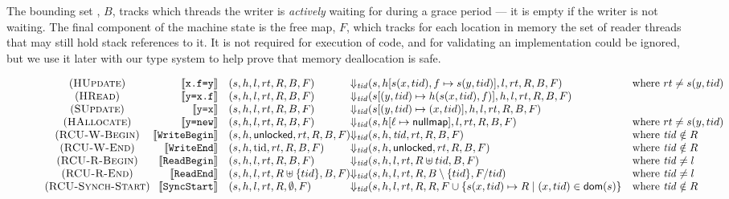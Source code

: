 The bounding set , $B$, tracks which threads the writer is \emph{actively} waiting for during a grace period --- it is empty if the writer is not waiting.
The final component of the machine state is the free map, $F$, which tracks for each location in memory the set of reader threads that may still hold stack references to it.  It is not required for execution of code, and for validating an implementation could be ignored, but we use it later with our type system to help prove that memory deallocation is safe.
\begin{figure*}%
\tiny
\[\begin{array}{c@{\;}rl@{\Downarrow_{\mathit{tid}}}ll}
(\textsc{HUpdate}) & \llbracket\texttt{x.f=y}\rrbracket   &(s,h,l,rt,R,B,F)& (s,h[s(x,tid),f \mapsto s(y,tid)],l,rt,R,B,F) &\textrm{where}~ rt \neq s(y,tid)\\
(\textsc{HRead})   & \llbracket\texttt{y=x.f}\rrbracket   &(s,h,l,rt,R,B,F)& (s[(y,tid) \mapsto h(s(x,tid),f)],h,l,rt,R,B,F) & \\
(\textsc{SUpdate}) & \llbracket\texttt{y=x}\rrbracket     &(s,h,l,rt,R,B,F)& (s[(y,tid) \mapsto (x,tid)],h,l,rt,R,B,F) &\\
(\textsc{HAllocate}) & \llbracket\texttt{y=new}\rrbracket &(s,h,l,rt,R,B,F)& (s,h[\ell\mapsto\mathsf{nullmap}],l,rt,R,B,F) & \textrm{where}~ rt \neq s(y,tid) \\
(\textsc{RCU-W-Begin}) & \llbracket\texttt{WriteBegin}\rrbracket & (s,h,\mathsf{unlocked},rt,R,B,F) &(s,h,\mathit{tid},rt,R,B,F) & \textrm{where}~\mathit{tid}\notin R\\
(\textsc{RCU-W-End}) & \llbracket\texttt{WriteEnd}\rrbracket & (s,h,\mathrm{tid},rt,R,B,F) & (s,h,\mathsf{unlocked},rt,R,B,F) & \textrm{where}~\mathit{tid}\notin R\\
(\textsc{RCU-R-Begin}) & \llbracket\texttt{ReadBegin}\rrbracket & (s,h,l,rt,R,B,F) & (s,h,l,rt,R\uplus tid,B,F) & \textrm{where}~\mathit{tid}\neq l\\
(\textsc{RCU-R-End}) & \llbracket\texttt{ReadEnd}\rrbracket & (s,h,l,rt,R\uplus\{tid\},B,F) & (s,h,l,rt,R,B\setminus \{tid\},F / tid)  &
\textrm{where}~\mathit{tid}\neq l\\
(\textsc{RCU-Synch-Start}) & \llbracket\texttt{SyncStart}\rrbracket & (s,h,l,rt,R,\emptyset,F) & (s,h,l,rt,R,R,F\cup\{s(x,tid)\mapsto R \mid (x,tid)\in\mathsf{dom}(s)\} & \textrm{where}~\mathit{tid} \notin R \\ %

\end{array}\]
\end{figure*}
